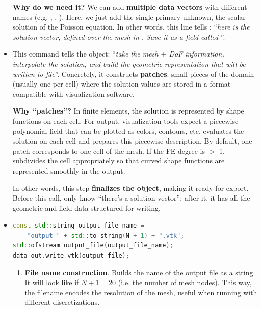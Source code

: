 \begin{itemize}
    \textcolor{Green3}{ \textbf{Why do we need it?}} We can add \textbf{multiple data vectors} with different names (e.g. , , ). Here, we just add the single primary unknown, the scalar solution of the Poisson equation. In other words, this line tells : ``\emph{here is the solution vector, defined over the mesh in . Save it as a field called }''.
    

    \item {} This command tells the  object: ``\emph{take the mesh $+$ DoF information, interpolate the solution, and build the geometric representation that will be written to file}''. Concretely, it constructs \textbf{patches}: small pieces of the domain (usually one per cell) where the solution values are stored in a format compatible with visualization software.
    
    \textcolor{Green3}{ \textbf{Why ``patches''?}} In finite elements, the solution is represented by shape functions on each cell. For output, visualization tools expect a piecewise polynomial field that can be plotted as colors, contours, etc.  evaluates the solution on each cell and prepares this piecewise description. By default, one patch corresponds to one cell of the mesh. If the FE degree is $>$ 1,  subdivides the cell appropriately so that curved shape functions are represented smoothly in the output.

    In other words, this step \textbf{finalizes the  object}, making it ready for export. Before this call,  only know ``there's a solution vector''; after it, it has all the geometric and field data structured for writing.
    

    \item {}
    \begin{lstlisting}[language=C++]
const std::string output_file_name =
    "output-" + std::to_string(N + 1) + ".vtk";
std::ofstream output_file(output_file_name);
data_out.write_vtk(output_file);\end{lstlisting}
    \begin{enumerate}
        \item \textbf{File name construction}. Builds the name of the output file as a string. It will look like  if $N+1=20$ (i.e. the number of mesh nodes). This way, the filename encodes the resolution of the mesh, useful when running with different discretizations.


\end{enumerate}
\end{itemize}

